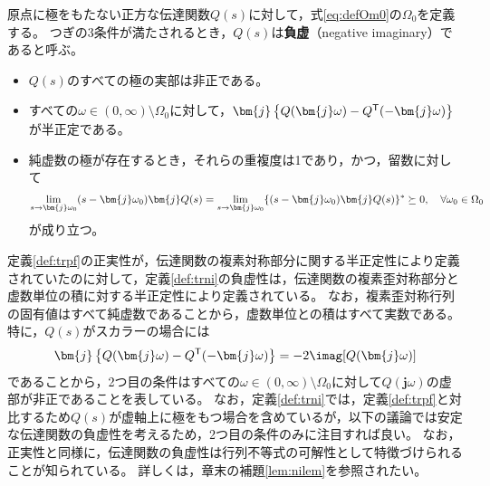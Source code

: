 \documentclass[tombow,dvipdfmx]{corona-a5-1.1}
\begin{document}
\begin{定義}[伝達関数の負虚性]
\label{def:trni}
原点に極をもたない正方な伝達関数$Q(s)$に対して，式\ref{eq:defOm0}の$\Omega_0$を定義する。
つぎの3条件が満たされるとき，$Q(s)$は\textbf{負虚}（negative imaginary）であると呼ぶ。
\begin{itemize}
\item $Q(s)$のすべての極の実部は非正である。
\item すべての$\omega \in (0,\infty)\setminus \Omega_0$に対して，$\bm{j}\left\{Q(\bm{j} \omega) - Q^{\sf T}(-\bm{j} \omega) \right\}$が半正定である。
\item 純虚数の極が存在するとき，それらの重複度は1であり，かつ，留数に対して
\begin{align*}
\lim_{s \rightarrow \bm{j} \omega_0} (s-\bm{j} \omega_0) \bm{j} Q(s) = 
\lim_{s\rightarrow \bm{j} \omega_0} \{ (s-\bm{j} \omega_0) \bm{j} Q(s)\}^{\sf *}\succeq 0
,\quad
\forall \omega_0 \in \Omega_0
\end{align*}
が成り立つ。
\end{itemize}
\end{定義}

定義\ref{def:trpf}の正実性が，伝達関数の複素対称部分に関する半正定性により定義されていたのに対して，定義\ref{def:trni}の負虚性は，伝達関数の複素歪対称部分と虚数単位の積に対する半正定性により定義されている。
なお，複素歪対称行列の固有値はすべて純虚数であることから，虚数単位との積はすべて実数である。
特に，$Q(s)$がスカラーの場合には
\begin{align*}
\bm{j}\left\{Q(\bm{j} \omega) - Q^{\sf T}(-\bm{j} \omega) \right\}
= -2 \imag[Q(\bm{j} \omega)]
\end{align*}
であることから，2つ目の条件はすべての$\omega \in (0,\infty)\setminus \Omega_0$に対して$Q(\bm{j}\omega)$の虚部が非正であることを表している。
なお，定義\ref{def:trni}では，定義\ref{def:trpf}と対比するため$Q(s)$が虚軸上に極をもつ場合を含めているが，以下の議論では安定な伝達関数の負虚性を考えるため，2つ目の条件のみに注目すれば良い。
なお，正実性と同様に，伝達関数の負虚性は行列不等式の可解性として特徴づけられることが知られている。
詳しくは，章末の補題\ref{lem:nilem}を参照されたい。
\end{document}

